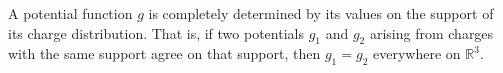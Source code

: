 A potential function $g$ is completely determined by its values on the support of its charge distribution. That is, if two potentials $g_1$ and $g_2$ arising from charges with the same support agree on that support, then $g_1 = g_2$ everywhere on $\mathbb{R}^3$.

